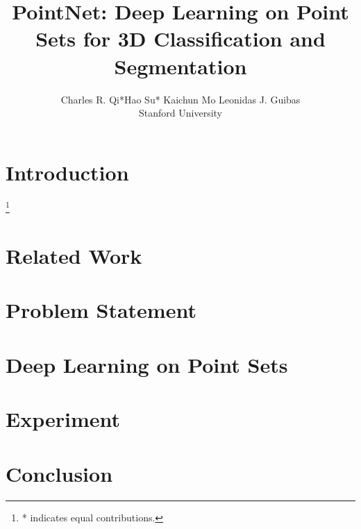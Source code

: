\documentclass[10pt,twocolumn,letterpaper]{article}
\newcommand\blfootnote[1]{%
  \begingroup
  \renewcommand\thefootnote{}\footnote{#1}%
  \addtocounter{footnote}{-1}%
  \endgroup
}
\begin{document}
\title{PointNet: Deep Learning on Point Sets for 3D Classification and Segmentation}


\author{Charles R. Qi*\qquad Hao Su* \qquad Kaichun Mo \qquad Leonidas J. Guibas\\Stanford University}

\maketitle

\begin{abstract}
  
\end{abstract}

\section{Introduction}
\blfootnote{* indicates equal contributions.}


\section{Related Work}


\section{Problem Statement}


\section{Deep Learning on Point Sets}


\section{Experiment}


\section{Conclusion}




{\small


}

\newpage


% 
\end{document}

